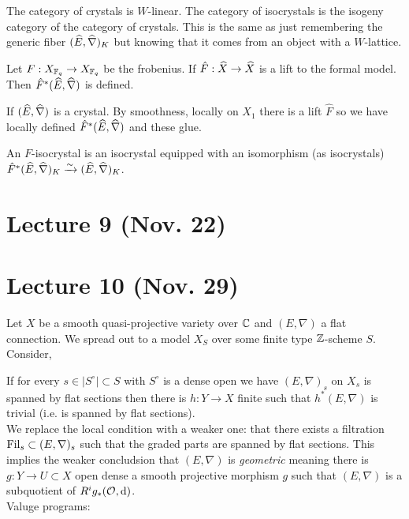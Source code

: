 \documentclass[12pt]{article}
\begin{document}
\begin{defn}
The category of crystals is $W$-linear. The category of isocrystals is the isogeny category of the category of crystals. This is the same as just remembering the generic fiber $(\widehat{E}, \widehat{\nabla})_K$ but knowing that it comes from an object with a $W$-lattice. 
\end{defn}

\begin{rmk}
Let $F : X_{\mathbb{F}_q} \to X_{\mathbb{F}_q}$ be the frobenius. If $\hat{F} : \widehat{X} \to \widehat{X}$ is a lift to the formal model. Then $\hat{F}^* (\widehat{E}, \widehat{\nabla})$ is defined.
\end{rmk}

\begin{theorem}
If $(\widehat{E}, \widehat{\nabla})$ is a crystal. By smoothness, locally on $X_1$ there is a lift $\hat{F}$ so we have locally defined $\hat{F}^* (\widehat{E}, \widehat{\nabla})$ and these glue.
\end{theorem}

\begin{defn}
An $F$-isocrystal is an isocrystal equipped with an isomorphism (as isocrystals) $\hat{F}^* (\widehat{E}, \widehat{\nabla})_K \xrightarrow{\sim} (\widehat{E}, \widehat{\nabla})_K$.
\end{defn}


\section{Lecture 9 (Nov. 22)}



\section{Lecture 10 (Nov. 29)}

Let $X$ be a smooth quasi-projective variety over $\mathbb{C}$ and $(E, \nabla)$ a flat connection. We spread out to a model $X_S$ over some finite type $\mathbb{Z}$-scheme $S$. Consider,
\begin{center}
\end{center}

If for every $s \in |S^\circ| \subset S$ with $S^\circ$ is a dense open we have $(E, \nabla)_s$ on $X_s$ is spanned by flat sections then there is $h : Y \to X$ finite \etale such that $h^*(E, \nabla)$ is trivial (i.e. is spanned by flat sections). 
\bigskip\\
We replace the local condition with a weaker one: that there exists a filtration $\mathrm{Fil}_s \subset (E, \nabla)_s$ such that the graded parts are spanned by flat sections. This implies the weaker concludsion that $(E, \nabla)$ is \textit{geometric} meaning there is $g : Y \to U \subset X$ open dense a smooth projective morphism $g$ such that $(E, \nabla)$ is a subquotient of $R^i g_* (\mathcal{O}_{}, \mathrm{d})$. 
\bigskip\\
Valuge programs:
\end{document}
